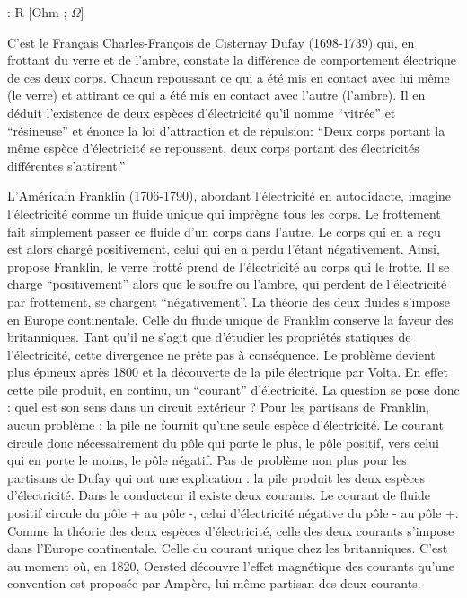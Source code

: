 \begin{encadre}
     : R [Ohm ; \(\Omega\)]
\end{encadre}

\newpage
\begin{tcolorbox}[colback=mygray1,breakable,colframe=mygray2,sharp corners=northwest,title=Sens conventionnel et sens réel du courant électrique]

    C'est le Français Charles-François de Cisternay Dufay (1698-1739) qui, en frottant du verre et de l'ambre, constate la différence de comportement électrique de ces deux corps. Chacun repoussant ce qui a été mis en contact avec lui même (le verre) et attirant ce qui a été mis en contact avec l'autre (l'ambre).
    Il en déduit l'existence de deux espèces d'électricité qu'il nomme \enquote{vitrée} et \enquote{résineuse} et énonce la loi d'attraction et de répulsion:
    \enquote{Deux corps portant la même espèce d'électricité se repoussent, deux corps portant des électricités différentes s'attirent.}

    L'Américain Franklin (1706-1790), abordant l'électricité en autodidacte, imagine l'électricité comme un fluide unique qui imprègne tous les corps.
    Le frottement fait simplement passer ce fluide d'un corps dans l'autre. Le corps qui en a reçu est alors chargé positivement, celui qui en a perdu l'étant négativement.
    Ainsi, propose Franklin, le verre frotté prend de l'électricité au corps qui le frotte. Il se charge \enquote{positivement} alors que le soufre ou l'ambre, qui perdent de l'électricité par frottement, se chargent \enquote{négativement}.
    La théorie des deux fluides s'impose en Europe continentale. Celle du fluide unique de Franklin conserve la faveur des britanniques.
    Tant qu'il ne s'agit que d'étudier les propriétés statiques de l'électricité, cette divergence ne prête pas à conséquence. Le problème devient plus épineux après 1800 et la découverte de la pile électrique par Volta.
    En effet cette pile produit, en continu, un \enquote{courant} d'électricité. La question se pose donc : quel est son sens dans un circuit extérieur ?
    Pour les partisans de Franklin, aucun problème : la pile ne fournit qu'une seule espèce d'électricité. Le courant circule donc nécessairement du pôle qui porte le plus, le pôle positif, vers celui qui en porte le moins, le pôle négatif.
    Pas de problème non plus pour les partisans de Dufay qui ont une explication : la pile produit les deux espèces d'électricité. Dans le conducteur il existe deux courants. Le courant de fluide positif circule du pôle + au pôle -, celui d'électricité négative du pôle - au pôle +.
    Comme la théorie des deux espèces d'électricité, celle des deux courants s'impose dans l'Europe continentale. Celle du courant unique chez les britanniques.
    C'est au moment où, en 1820, Oersted découvre l'effet magnétique des courants qu'une convention est proposée par Ampère, lui même partisan des deux courants.


\end{tcolorbox}
